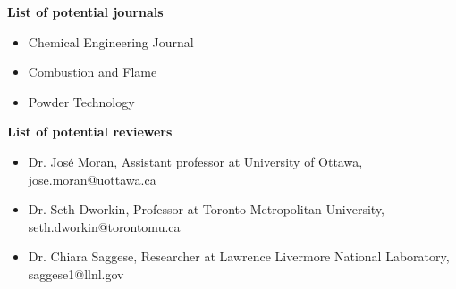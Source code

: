 \textbf{\large{List of potential journals}}
\vspace{0.3cm}
\begin{itemize}
	\item Chemical Engineering Journal
	\item Combustion and Flame
	\item Powder Technology
\end{itemize}

\vspace{1cm}
\textbf{\large{List of potential reviewers}}
\vspace{0.3cm}

\begin{itemize}
	\item Dr. José Moran, Assistant professor at University of Ottawa, jose.moran@uottawa.ca
	\item Dr. Seth Dworkin, Professor at Toronto Metropolitan University, seth.dworkin@torontomu.ca
	\item Dr. Chiara Saggese, Researcher at Lawrence Livermore National Laboratory, saggese1@llnl.gov
\end{itemize}